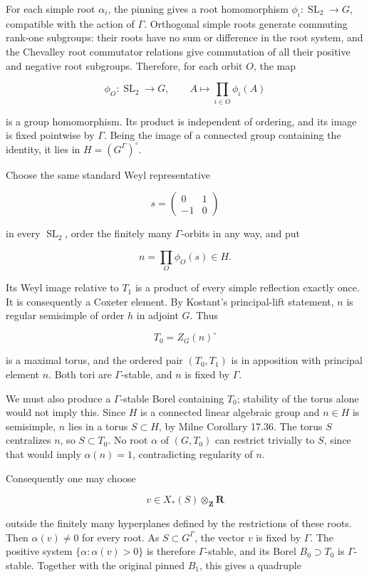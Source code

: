 For each simple root \(\alpha_i\), the pinning gives a root homomorphism
\(\phi_i:\operatorname{SL}_2\to G\), compatible with the action of
\(\Gamma\). Orthogonal simple roots generate commuting rank-one
subgroups: their roots have no sum or difference in the root system, and
the Chevalley root commutator relations give commutation of all their
positive and negative root subgroups. Therefore, for each orbit \(O\),
the map

\[
 \phi_O:\operatorname{SL}_2\longrightarrow G,\qquad
 A\longmapsto\prod_{i\in O}\phi_i(A)
\]

is a group homomorphism. Its product is independent of ordering, and its
image is fixed pointwise by \(\Gamma\). Being the image of a connected
group containing the identity, it lies in \(H=(G^\Gamma)^\circ\).

Choose the same standard Weyl representative

\[
 s=\begin{pmatrix}0&1\\-1&0\end{pmatrix}
\]

in every \(\operatorname{SL}_2\), order the finitely many
\(\Gamma\)-orbits in any way, and put

\[
 n=\prod_O\phi_O(s)\in H.
 \tag{CC-APG.15}
\]

Its Weyl image relative to \(T_1\) is a product of every simple
reflection exactly once. It is consequently a Coxeter element. By
Kostant's principal-lift statement, \(n\) is regular semisimple of order
\(h\) in adjoint \(G\). Thus

\[
 T_0=Z_G(n)^\circ
\]

is a maximal torus, and the ordered pair \((T_0,T_1)\) is in apposition
with principal element \(n\). Both tori are \(\Gamma\)-stable, and \(n\)
is fixed by \(\Gamma\).

We must also produce a \(\Gamma\)-stable Borel containing \(T_0\);
stability of the torus alone would not imply this. Since \(H\) is a
connected linear algebraic group and \(n\in H\) is semisimple, \(n\)
lies in a torus \(S\subset H\), by Milne Corollary 17.36. The torus
\(S\) centralizes \(n\), so \(S\subset T_0\). No root \(\alpha\) of
\((G,T_0)\) can restrict trivially to \(S\), since that would imply
\(\alpha(n)=1\), contradicting regularity of \(n\).

Consequently one may choose

\[
 v\in X_*(S)\otimes_{\mathbf Z}\mathbf R
\]

outside the finitely many hyperplanes defined by the restrictions of
these roots. Then \(\alpha(v)\ne0\) for every root. As
\(S\subset G^\Gamma\), the vector \(v\) is fixed by \(\Gamma\). The
positive system \(\{\alpha:\alpha(v)>0\}\) is therefore
\(\Gamma\)-stable, and its Borel \(B_0\supset T_0\) is
\(\Gamma\)-stable. Together with the original pinned \(B_1\), this gives
a quadruple

